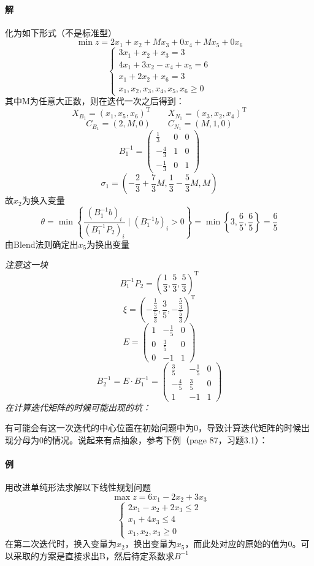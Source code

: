 \documentclass[]{report}
\begin{document}
		\paragraph{解} 化为如下形式（不是标准型）\[\min z=2x_1+x_2+Mx_3+0x_4+Mx_5+0x_6\]\[\begin{cases}
			3x_1+x_2+x_3=3\\
			4x_1+3x_2-x_4+x_5=6\\
			x_1+2x_2+x_6=3\\
			x_1,x_2,x_3,x_4,x_5,x_6\ge0
		\end{cases}\]其中M为任意大正数，则在迭代一次之后得到：
		\[X_{B_1}=(x_1,x_5,x_6)^{\mathrm{T}}\qquad X_{N_1}=(x_3,x_2,x_4)^{\mathrm{T}}\]
		\[C_{B_1}=(2,M,0)\qquad C_{N_1}=(M,1,0)\]
		\[B_1^{-1}=\begin{pmatrix}
			\frac{1}{3}&0&0\\
			-\frac{4}{3}&1&0\\
			-\frac{1}{3}&0&1
		\end{pmatrix}\]
		\[\sigma_1=(-\frac{2}{3}+\frac{7}{3}M,\frac{1}{3}-\frac{5}{3}M,M)\]
		故$x_2$为换入变量
		\[\theta=\min\left\{\frac{(B_1^{-1}b)_i}{(B_1^{-1}P_2)_i}\mid(B_1^{-1}b)_i>0\right\}=\min\left\{3,\frac{6}{5},\frac{6}{5}\right\}=\frac{6}{5}\]
		由Blend法则确定出$x_5$为换出变量\par
		\textsf{\textit{注意这一块}}
		\[B_1^{-1}P_2=\left(\frac{1}{3},\frac{5}{3},\frac{5}{3}\right)^{\mathrm{T}}\]
		\[\xi=\left(-\frac{\frac{1}{3}}{\frac{5}{3}},\frac{3}{5},-\frac{\frac{5}{3}}{\frac{5}{3}}\right)^{\mathrm{T}}\]
		\[E=\begin{pmatrix}
			1&-\frac{1}{5}&0\\
			0&\frac{3}{5}&0\\
			0&-1&1
		\end{pmatrix}\]
		\[B_2^{-1}=E\cdot B_1^{-1}=\begin{pmatrix}
			\frac{3}{5}&-\frac{1}{5}&0\\
			-\frac{4}{5}&\frac{3}{5}&0\\
			1&-1&1
		\end{pmatrix}\]
		\textsf{\textit{在计算迭代矩阵的时候可能出现的坑：}}\par
		有可能会有这一次迭代的中心位置在初始问题中为0，导致计算迭代矩阵的时候出现分母为0的情况。说起来有点抽象，参考下例（page 87，习题3.1）：
		\paragraph{例} 用改进单纯形法求解以下线性规划问题\[\max z=6x_1-2x_2+3x_3\]\[\begin{cases}
			2x_1-x_2+2x_3\le2\\
			x_1+4x_3\le4\\
			x_1,x_2,x_3\ge0
		\end{cases}\]在第二次迭代时，换入变量为$x_2$，换出变量为$x_5$，而此处对应的原始的值为0。可以采取的方案是直接求出B，然后待定系数求$B^{-1}$
\end{document}
